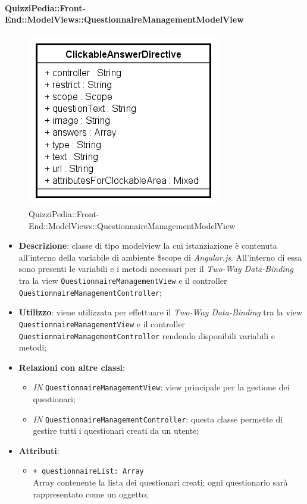 \paragraph{QuizziPedia::Front-End::ModelViews::QuestionnaireManagementModelView}
	
	\label{QuizziPedia::Front-End::ModelViews::QuestionnaireManagementModelView}
	
	\begin{figure}[ht]
		\centering
		\includegraphics[scale=0.5,keepaspectratio]{UML/Classi/Front-End/QuizziPedia_Front-end_Templates_ClickableAnswerTemplate.png}
		\caption{QuizziPedia::Front-End::ModelViews::QuestionnaireManagementModelView}
	\end{figure} \FloatBarrier
	
	\begin{itemize}
		\item \textbf{Descrizione}: classe di tipo modelview la cui istanziazione è contenuta all'interno della variabile di ambiente \$scope di \textit{Angular.js}. All'interno di essa sono presenti le variabili e i metodi necessari per il \textit{Two-Way Data-Binding} tra la view \texttt{QuestionnaireManagementView} e il controller \texttt{QuestionnaireManagementController};
		\item \textbf{Utilizzo}: viene utilizzata per effettuare il \textit{Two-Way Data-Binding} tra la view \texttt{QuestionnaireManagementView} e il controller \texttt{QuestionnaireManagementController} rendendo disponibili variabili e metodi;
		\item \textbf{Relazioni con altre classi}: 
		\begin{itemize}
			\item \textit{IN} \texttt{QuestionnaireManagementView}: view principale per la gestione dei questionari; 
			\item \textit{IN} \texttt{QuestionnaireManagementController}: questa classe permette di gestire tutti i questionari creati da un utente;
		\end{itemize}
		\item \textbf{Attributi}: 
		\begin{itemize}
			\item \texttt{+ questionnaireList: Array} \\ Array contenente la lista dei questionari creati; ogni questionario sarà rappresentato come un oggetto;
		\end{itemize}
	\end{itemize}
	
	